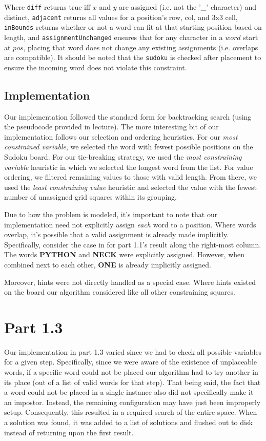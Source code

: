 \documentclass{article}
\begin{document}
Where \texttt{diff} returns true iff $x$ and $y$ are assigned (i.e. not the '\_' character) and distinct, \texttt{adjacent} returns all values for a position's row, col, and 3x3 cell, \texttt{inBounds} returns whether or not a word can fit at that starting position based on length, and \texttt{assignmentUnchanged} ensures that for any character in a $word$ start at $pos$, placing that word does not change any existing assignments (i.e. overlaps are compatible). It should be noted that the \texttt{sudoku} is checked after placement to ensure the incoming word does not violate this constraint.

\subsection{Implementation}
Our implementation followed the standard form for backtracking search (using the pseudocode provided in lecture). The more interesting bit of our implementation follows our selection and ordering heuristics. For our \emph{most constrained variable}, we selected the word with fewest possible positions on the Sudoku board. For our tie-breaking strategy, we used the \emph{most constraining variable} heuristic in which we selected the longest word from the list. For value ordering, we filtered remaining values to those with valid length. From there, we used the \emph{least constraining value} heuristic and selected the value with the fewest number of unassigned grid squares within its grouping.

Due to how the problem is modeled, it's important to note that our implementation need not explicitly assign \emph{each} word to a position. Where words overlap, it's possible that a valid assignment is already made implicitly. Specifically, consider the case in for part 1.1's result along the right-most column. The words \textbf{PYTHON} and \textbf{NECK} were explicitly assigned. However, when combined next to each other, \textbf{ONE} is already implicitly assigned.

Moreover, hints were not directly handled as a special case. Where hints existed on the board our algorithm considered like all other constraining squares.

\section{Part 1.3}
Our implementation in part 1.3 varied since we had to check all possible variables for a given step. Specifically, since we were aware of the existence of unplaceable words, if a specific word could not be placed our algorithm had to try another in its place (out of a list of valid words for that step). That being said, the fact that a word could not be placed in a single instance also did not specifically make it an impostor. Instead, the remaining configuration may have just been improperly setup. Consequently, this resulted in a required search of the entire space. When a solution was found, it was added to a list of solutions and flushed out to disk instead of returning upon the first result.
\end{document}
